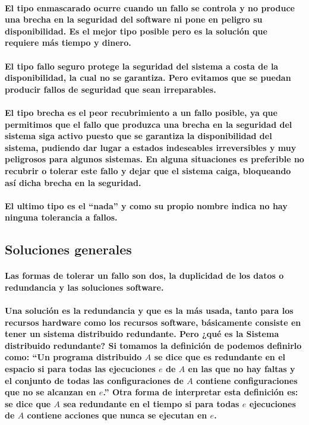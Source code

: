 \documentclass{./llncs2e/llncs}
\begin{document}
\paragraph{
El tipo \textbf{enmascarado} ocurre cuando un fallo se controla y no produce una brecha en la seguridad del software ni pone en peligro su disponibilidad. Es el mejor tipo posible pero es la soluci\'{o}n que requiere m\'{a}s tiempo y dinero.
}

\paragraph{
El tipo \textbf{fallo seguro} protege la seguridad del sistema a costa de la disponibilidad, la cual no se garantiza. Pero evitamos que se puedan producir fallos de seguridad que sean irreparables.
}

\paragraph{
El tipo \textbf{brecha} es el peor recubrimiento a un fallo posible, ya que permitimos que el fallo que produzca una brecha en la seguridad del sistema siga activo puesto que se garantiza la disponibilidad del sistema, pudiendo dar lugar a estados indeseables irreversibles y muy peligrosos para algunos sistemas. En alguna situaciones es preferible no recubrir o tolerar este fallo y dejar que el sistema caiga, bloqueando as\'{i} dicha brecha en la seguridad.
}

\paragraph{
El ultimo tipo es el ``nada'' y como su propio nombre indica no hay ninguna tolerancia a fallos.
}

\subsection{Soluciones generales}
\paragraph{
Las formas de tolerar un fallo son dos, la duplicidad de los datos o redundancia y las soluciones software. 
}

\paragraph{
Una solución es la redundancia y que es la más usada, tanto para los recursos hardware como los recursos software, b\'{a}sicamente consiste en tener un sistema distribuido redundante. Pero ¿qu\'{e} es la Sistema distribuido redundante?  Si tomamos la definici\'{o}n de \cite{Gartner} podemos definirlo como: ``Un programa distribuido $A$ se dice que es redundante en el espacio si para todas las ejecuciones $e$ de $A$ en las que no hay faltas y el conjunto de todas las configuraciones de $A$ contiene configuraciones que no se alcanzan en $e$.'' Otra forma de interpretar esta definici\'{o}n es: se dice que $A$ sea redundante en el tiempo si para todas $e$ ejecuciones de $A$ contiene acciones que nunca se ejecutan en $e$.
}
\end{document}
